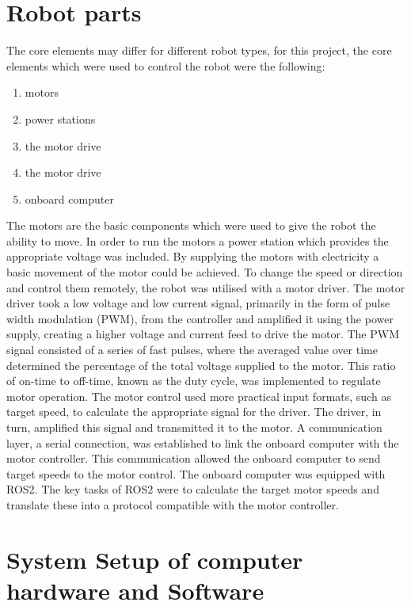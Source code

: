 \newpage
\section{Robot parts}


The core elements may differ for different robot types, for this project, the core elements which were used to control the robot were the following: 

\begin{enumerate}
    \item motors
    \item power stations
    \item the motor drive
    \item the motor drive
    \item onboard computer
\end{enumerate}

The motors are the basic components which were used to give the robot the ability to move. In order to run the motors a power station which provides the appropriate voltage was included. By supplying the motors with electricity a basic movement of the motor could be achieved. 
To change the speed or direction and control them remotely, the robot was utilised with a motor driver. The motor driver took a low voltage and low current signal, primarily in the form of pulse width modulation (PWM), from the controller and amplified it using the power supply, creating a higher voltage and current feed to drive the motor.
The PWM signal consisted of a series of fast pulses, where the averaged value over time determined the percentage of the total voltage supplied to the motor. This ratio of on-time to off-time, known as the duty cycle, was implemented to regulate motor operation.
The motor control used more practical input formats, such as target speed, to calculate the appropriate signal for the driver. The driver, in turn, amplified this signal and transmitted it to the motor. A communication layer, a serial connection, was established to link the onboard computer with the motor controller. This communication allowed the onboard computer to send target speeds to the motor control.
The onboard computer was equipped with ROS2. The key tasks of ROS2 were to calculate the target motor speeds and translate these into a protocol compatible with the motor controller.

\section{System Setup of computer hardware and Software}


